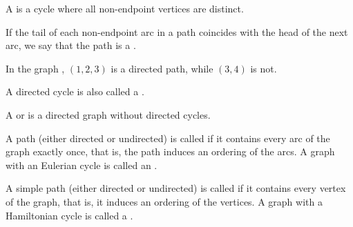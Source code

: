 \begin{definition}
\begin{DefEnum}
    A  is a cycle where all non-endpoint vertices are distinct.

    If the tail of each non-endpoint arc in a path coincides with the head of the next arc, we say that the path is a .

    In the graph , \( (1, 2, 3) \) is a directed path, while \( (3, 4) \) is not.

    A directed cycle is also called a .

    A  or  is a directed graph without directed cycles.

    \medskip

    A path (either directed or undirected) is called  if it contains every arc of the graph exactly once, that is, the path induces an ordering of the arcs. A graph with an Eulerian cycle is called an .

    A simple path (either directed or undirected) is called  if it contains every vertex of the graph, that is, it induces an ordering of the vertices. A graph with a Hamiltonian cycle is called a .
  \end{DefEnum}
\end{definition}

